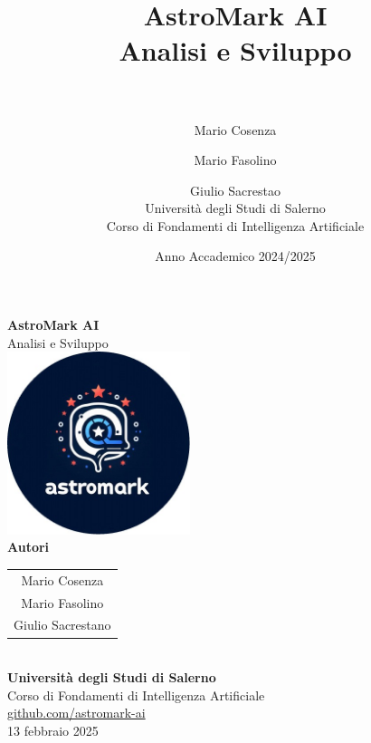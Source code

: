 \documentclass[a4paper,12pt]{report}
\title{%
  \textbf{AstroMark AI}\\[0.5cm]
  \large Analisi e Sviluppo\\[0.5cm]

  \\
}
\author{%
  Mario Cosenza \and
  Mario Fasolino \and
  Giulio Sacrestao\\[0.5cm]
  Università degli Studi di Salerno\\
  Corso di Fondamenti di Intelligenza Artificiale%
}
\date{Anno Accademico 2024/2025}
\begin{document}
\begin{titlepage}
    \centering
    \vspace*{1.5cm}

    {\Huge \textbf{AstroMark AI}}\\[1cm]
    {\Large {Analisi e Sviluppo}}\\[2cm]

    \includegraphics[width=0.4\textwidth]{images/astromarkLogo.jpg}\\[2.0cm]

    {\LARGE \textbf{Autori}}\\[0.5cm]
    \begin{tabular}{c}
        {\Large {Mario Cosenza}} \\[0.3cm]
        {\Large {Mario Fasolino}} \\[0.3cm]
        {\Large {Giulio Sacrestano}}
    \end{tabular}\\[1.5cm]

    {\large \textbf{Università degli Studi di Salerno}}\\[0.3cm]
    {\large Corso di Fondamenti di Intelligenza Artificiale}\\[0.3cm]

    {\Large \href{https://github.com/mariocosenza/astromark-ai}{\faGithub\; github.com/astromark-ai}}\\[2.0cm]

    {\large 13 febbraio 2025}

    \vfill
\end{titlepage}
\newpage

\pagestyle{fancy}
\fancyhf{}
\fancyfoot[C]{\thepage}

\tableofcontents
\newpage











\appendix

\end{document}
